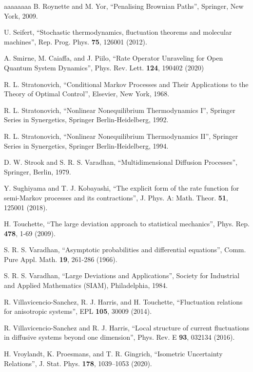 \documentclass[a4paper,11pt]{article}
\numberwithin{equation}{section}
\begin{document}
\begin{thebibliography}{aaaaaaaa}
 B. Roynette and M. Yor, ``Penalising Brownian Paths'', Springer, New York, 2009.

 U. Seifert, ``Stochastic thermodynamics, fluctuation theorems and molecular machines'', Rep. Prog. Phys. {\bf 75}, 126001 (2012).

 A. Smirne, M. Caiaffa, and J. Piilo, ``Rate Operator Unraveling for Open Quantum System Dynamics'', Phys. Rev. Lett. {\bf 124}, 190402 (2020)

 R. L. Stratonovich, ``Conditional Markov Processes and Their Applications to the Theory of Optimal Control'', Elsevier, New York, 1968.

 R. L. Stratonovich, ``Nonlinear Nonequilibrium Thermodynamics I'', Springer Series in Synergetics, Springer Berlin-Heidelberg, 1992.

 R. L. Stratonovich, ``Nonlinear Nonequilibrium Thermodynamics II'', Springer Series in Synergetics, Springer Berlin-Heidelberg, 1994.

 D. W. Strook and S. R. S. Varadhan, ``Multidimensional Diffusion Processes'', Springer, Berlin, 1979.

 Y. Sughiyama and T. J. Kobayashi, ``The explicit form of the rate function for semi-Markov processes and its contractions'',  J. Phys. A: Math. Theor. {\bf 51}, 125001 (2018).

 H. Touchette, ``The large deviation approach to statistical mechanics'', Phys. Rep. {\bf 478}, 1-69 (2009).

 S. R. S. Varadhan, ``Asymptotic probabilities and differential equations'', Comm. Pure Appl. Math. {\bf 19}, 261-286 (1966).

 S. R. S. Varadhan, ``Large Deviations and Applications'', Society for Industrial and Applied Mathematics (SIAM), Philadelphia, 1984.

 R. Villavicencio-Sanchez, R. J. Harris, and H. Touchette, ``Fluctuation relations for anisotropic systems'', EPL {\bf 105}, 30009 (2014).

 R. Villavicencio-Sanchez and R. J. Harris, ``Local structure of current fluctuations in diffusive systems beyond one dimension'', Phys. Rev. E {\bf 93}, 032134 (2016).

 H. Vroylandt, K. Proesmans, and T. R. Gingrich, ``Isometric Uncertainty Relations'', J. Stat. Phys. {\bf 178}, 1039–1053 (2020).


\end{thebibliography}
\end{document}
